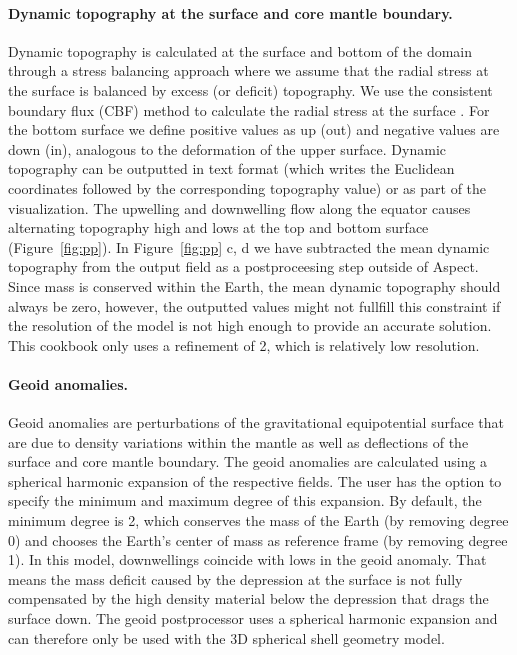 \documentclass{article}
\begin{document}
\paragraph{Dynamic topography at the surface and core mantle boundary.}
Dynamic topography is calculated at the surface and bottom of the domain 
through a stress balancing approach where we assume that the radial stress at 
the surface is balanced by excess (or deficit) topography. We use the 
consistent boundary flux (CBF) method to calculate the radial stress 
at the surface \cite{ZGH93}. For the 
bottom surface we define positive values as up (out)
and negative values are down (in), analogous to the deformation of the upper 
surface. Dynamic topography can be outputted in text format (which writes the 
Euclidean coordinates followed by the corresponding topography value) or as 
part of the visualization. The upwelling and downwelling flow along the 
equator causes alternating topography high and lows at the top and
bottom surface (Figure~\ref{fig:pp}). 
In Figure~\ref{fig:pp} c, d we have subtracted the mean dynamic topography from
the output field as a postproceesing step outside of Aspect. Since mass is 
conserved within the Earth, the mean dynamic topography
should always be zero, however, the outputted values might not fullfill this 
constraint if the resolution of the model is not high enough to provide an
accurate solution. This cookbook only uses a refinement of 2, which is relatively
low resolution. 

\paragraph{Geoid anomalies.}
Geoid anomalies are perturbations of the gravitational equipotential surface that 
are due to density variations within the mantle as well as deflections of the 
surface and core mantle boundary. The geoid anomalies are calculated using a spherical
harmonic expansion of the respective fields. The user has the option to specify the 
minimum and maximum degree of this expansion. By default, the minimum degree is
2, which conserves the mass of the Earth (by removing degree 0) and chooses the
Earth's center of mass as reference frame (by removing degree 1). 
In this model, downwellings coincide with lows in the geoid anomaly. That 
means the mass deficit caused by the depression at the surface is not 
fully compensated by the high density material below the depression that 
drags the surface down. The geoid postprocessor uses a spherical harmonic 
expansion and can therefore only be used with the 3D spherical shell geometry model.
 
\end{document}
